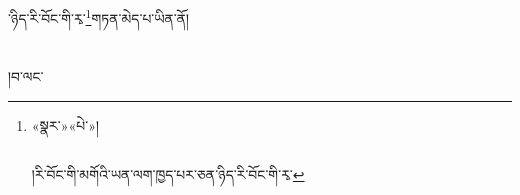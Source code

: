 ་ཉིད་རི་བོང་གི་རྭ་\footnote{«སྣར་»«པེ་»།\chapter{ }།རི་བོང་གི་མགོའི་ཡན་ལག་ཁྱད་པར་ཅན་ཉིད་རི་བོང་གི་རྭ་}གཏན་མེད་པ་ཡིན་ནོ།\chapter{ }།བ་ལང་